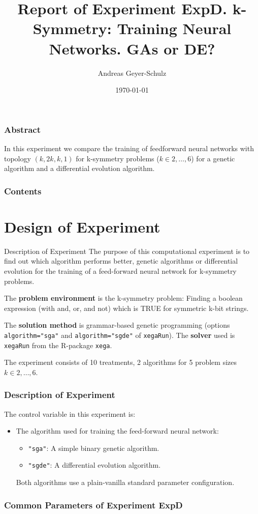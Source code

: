 \documentclass[18pt,c]{beamer}
\makeatletter
\let\beamer@writeslidentry@miniframeson=\beamer@writeslidentry
\newcommand*{\miniframeson}{\let\beamer@writeslidentry=\beamer@writeslidentry@miniframeson}
\makeatother
\begin{document}
\title{Report of Experiment ExpD. k-Symmetry: Training Neural Networks. GAs or DE?}
\author{Andreas Geyer-Schulz}
\date{\today}
\begin{frame}
\titlepage
\end{frame}
\begin{frame}
\frametitle{Abstract}
In this experiment we compare the training of feedforward neural networks with topology $(k, 2k, k, 1)$ for k-symmetry problems ($k\in 2, \dots, 6$) for a genetic algorithm and a differential evolution algorithm.%
\end{frame}
\begin{frame}[t, allowframebreaks]
\frametitle{Contents}
\tableofcontents[subsubsectionstyle=hide]
\vfill
\end{frame}
\miniframeson
\section{Design of Experiment}
\begin{frame}
\vspace*{2mm}
\begin{block}{
Description of Experiment
}
The purpose of this computational experiment is to find out
which algorithm performs better, genetic algorithms or differential evolution
for the training of a feed-forward neural network for k-symmetry problems.
 
The {\bf problem environment} is the k-symmetry problem: 
Finding a boolean expression (with and, or, and not)
which is TRUE for symmetric k-bit strings.
 
The {\bf solution method} is grammar-based genetic programming
(options {\tt algorithm="sga"} and {\tt algorithm="sgde"}  of {\tt xegaRun}).
The {\bf solver} used is {\tt xegaRun} from the R-package {\tt xega}.
 
The experiment consists of 10 treatments, 2 algorithms for 5 problem sizes $k\in 2,\dots, 6$.
\end{block}
\end{frame}%
\begin{frame}
\frametitle{
Description of Experiment
}
The control variable in this experiment is:
\begin{itemize}
\item The algorithm used for training the feed-forward neural network:
\begin{itemize} 
\item {\tt "sga"}: A simple binary genetic algorithm.
\item {\tt "sgde"}: A differential evolution algorithm.
\end{itemize}
Both algorithms use a plain-vanilla standard parameter configuration.
\end{itemize}
\end{frame}%
 \begin{frame}
 \fontsize{8pt}{9pt}\selectfont
 \frametitle{ Common Parameters of Experiment ExpD }

 \label{ExpDCommonTable000.tex}  
 \end{frame}
\end{document}

